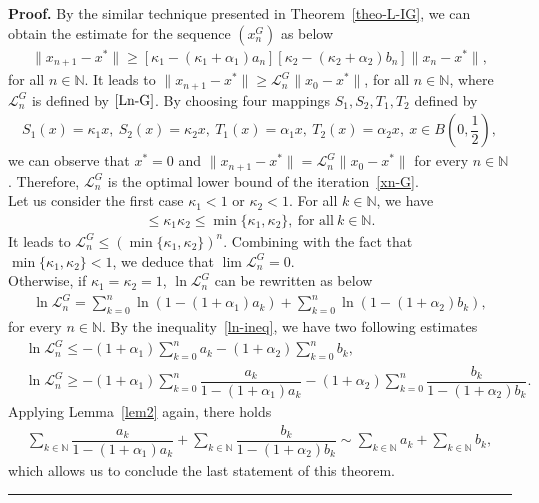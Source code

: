 \documentclass[a4paper, 11pt]{article}
\newenvironment{proof}[1][Proof]{\textbf{#1.} }{\hfill\rule{0.5em}{0.5em}}
\begin{document}
\begin{proof}
By the similar technique presented in Theorem~\ref{theo-L-IG}, we can obtain the estimate for the sequence $(x_n^G)$ as below
\begin{align*} 
\|x_{n+1}-x^*\| \ge [\kappa_1-(\kappa_1+\alpha_1)a_n][\kappa_2-(\kappa_2+\alpha_2)b_n]\|x_n-x^*\|,
\end{align*}
for all $n \in \mathbb{N}$. It leads to $\|x_{n+1}-x^*\| \ge \mathcal{L}_n^{G}\|x_0-x^*\|$, for all $n \in \mathbb{N}$,
where $\mathcal{L}_n^{G}$ is defined by $\eqref{Ln-G}$. By choosing four mappings $S_1,S_2,T_1,T_2$ defined by
\begin{align*}
S_1(x)=\kappa_1 x,  ~ S_2(x)=\kappa_2 x, ~ T_1(x)= \alpha_1 x, ~ T_2(x)=\alpha_2 x, ~ x \in B\left(0, \dfrac{1}{2}\right),
\end{align*}
we can observe that $x^*=0$ and $\|x_{n+1}-x^*\|=\mathcal{L}_n^{G}\|x_0-x^*\|$ for every $n \in \mathbb{N}$. Therefore, $\mathcal{L}_n^G$ is the optimal lower bound of the iteration~\eqref{xn-G}.\\

Let us consider the first case $\kappa_1<1$ or $\kappa_2<1$. For all $k \in \mathbb{N}$, we have
\begin{align*}
[\kappa_1-(\kappa_1+\alpha_1)a_k][\kappa_2-(\kappa_2+\alpha_2)b_k]\le \kappa_1  \kappa_2 \le \min\{\kappa_1,\kappa_2\},~ \text{for all} ~k \in \mathbb{N}.
\end{align*}
It leads to $\mathcal{L}_n^G\le (\min\{\kappa_1,\kappa_2\})^n$. Combining with the fact that $\min\{\kappa_1,\kappa_2\}<1$, we deduce that $\lim{\mathcal{L}_n^G}=0$.\\

Otherwise, if $\kappa_1=\kappa_2=1$, $\ln \mathcal{L}_n^G$ can be rewritten as below
\begin{align*}
\ln{\mathcal{L}_n^G} = \sum_{k=0}^{n}{\ln(1-(1+\alpha_1)a_k)}+\sum_{k=0}^{n}{\ln(1-(1+\alpha_2)b_k)},
\end{align*}
for every $n \in \mathbb{N}$. By the inequality~\eqref{ln-ineq}, we have two following estimates
\begin{align*}
&\ln{\mathcal{L}_n^G} \le -(1+\alpha_1)\sum_{k=0}^{n}{a_k}-(1+\alpha_2)\sum_{k=0}^{n}{b_k},\\
&\ln{\mathcal{L}_n^G} \ge -(1+\alpha_1)\sum_{k=0}^{n}{\dfrac{a_k}{1-(1+\alpha_1)a_k}}-(1+\alpha_2)\sum_{k=0}^{n}{\dfrac{b_k}{1-(1+\alpha_2)b_k}}.
\end{align*}
Applying Lemma~\ref{lem2} again, there holds
\begin{align*} 
\sum_{k \in \mathbb{N}} {\dfrac{a_k}{1-(1+\alpha_1)a_k}} + \sum_{k \in \mathbb{N}} {\dfrac{b_k}{1-(1+\alpha_2)b_k}} \sim \sum_{k \in \mathbb{N}}a_k+ \sum_{k \in \mathbb{N}}b_k,
\end{align*}
which allows us to conclude the last statement of this theorem. 
\end{proof}
\end{document}
